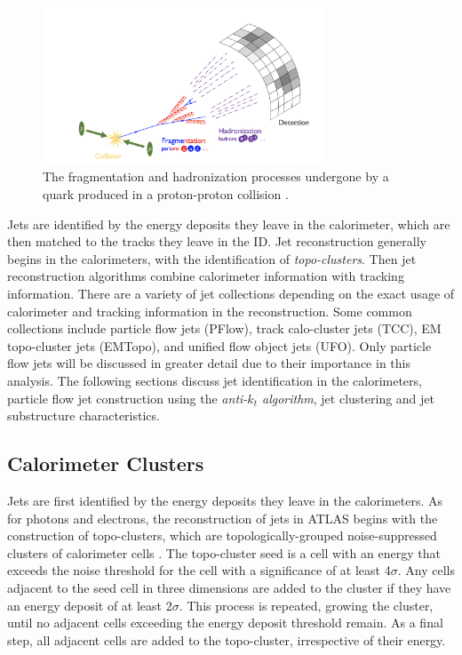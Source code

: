 \begin{figure}[h]
        \centering
	\includegraphics[width=0.75\textwidth]{figures/ch5/parton_shower}
	\caption{The fragmentation and hadronization processes undergone by a quark produced in a proton-proton collision \cite{frag_im}. }
	\label{fig:parton_shower}
\end{figure}

Jets are identified by the energy deposits they leave in the calorimeter, which are then matched to the tracks they leave in the ID. Jet reconstruction generally begins in the calorimeters, with the identification of \textit{topo-clusters}. Then jet reconstruction algorithms combine calorimeter information with tracking information. There are a variety of jet collections depending on the exact usage of calorimeter and tracking information in the reconstruction. Some common collections include particle flow jets (PFlow), track calo-cluster jets (TCC), EM topo-cluster jets (EMTopo), and unified flow object jets (UFO). Only particle flow jets will be discussed in greater detail due to their importance in this analysis. The following sections discuss jet identification in the calorimeters, particle flow jet construction using the \textit{anti-$k_t$ algorithm}, jet clustering and jet substructure characteristics.

\subsection{Calorimeter Clusters}
Jets are first identified by the energy deposits they leave in the calorimeters. As for photons and electrons, the reconstruction of jets in ATLAS begins with the construction of topo-clusters, which are topologically-grouped noise-suppressed clusters of calorimeter cells \cite{jet_reco}. The topo-cluster seed is a cell with an energy that exceeds the noise threshold for the cell with a significance of at least 4$\sigma$. Any cells adjacent to the seed cell in three dimensions are added to the cluster if they have an energy deposit of at least $2\sigma$. This process is repeated, growing the cluster, until no adjacent cells exceeding the energy deposit threshold remain. As a final step, all adjacent cells are added to the topo-cluster, irrespective of their energy. \par

